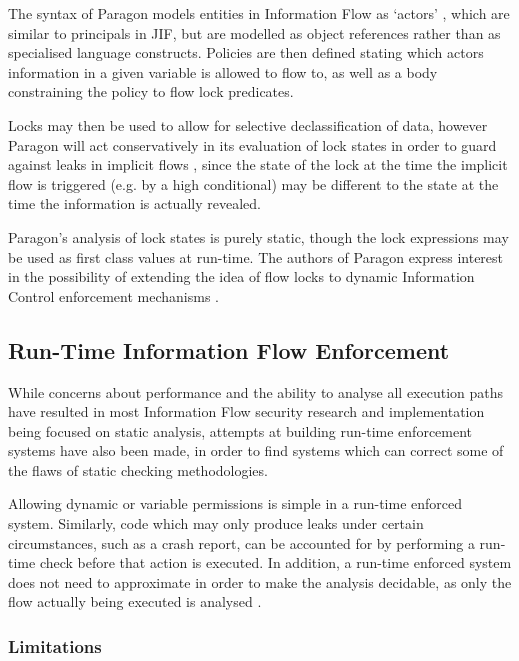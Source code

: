 The syntax of Paragon models entities in Information Flow as `actors' \cite{broberg2013paragon}, which are similar to principals in JIF, but are modelled as object references rather than as specialised language constructs. Policies are then defined stating which actors information in a given variable is allowed to flow to, as well as a body constraining the policy to flow lock predicates.

Locks may then be used to allow for selective declassification of data, however Paragon will act conservatively in its evaluation of lock states in order to guard against leaks in implicit flows \cite{broberg2013paragon}, since the state of the lock at the time the implicit flow is triggered (e.g. by a high conditional) may be different to the state at the time the information is actually revealed.

Paragon's analysis of lock states is purely static, though the lock expressions may be used as first class values at run-time. The authors of Paragon express interest in the possibility of extending the idea of flow locks to dynamic Information Control enforcement mechanisms \cite{broberg2013paragon}.

\subsection{Run-Time Information Flow Enforcement}

While concerns about performance and the ability to analyse all execution paths have resulted in most Information Flow security research and implementation being focused on static analysis, attempts at building run-time enforcement systems have also been made, in order to find systems which can correct some of the flaws of static checking methodologies.

Allowing dynamic or variable permissions is simple in a run-time enforced system. Similarly, code which may only produce leaks under certain circumstances, such as a crash report, can be accounted for by performing a run-time check before that action is executed. In addition, a run-time enforced system does not need to approximate in order to make the analysis decidable, as only the flow actually being executed is analysed \cite{venkatakrishnan2006runtime}.

\pagebreak

\subsubsection{Limitations}

